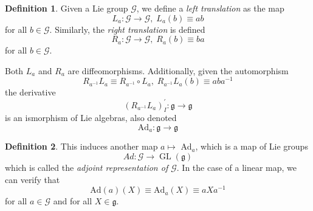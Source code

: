 \documentclass{article}
\DeclareMathOperator{\GL}{GL}
\theoremstyle{remark}
\theoremstyle{definition}
\newtheorem{definition}{Definition}[section]
\begin{document}
\begin{definition}
Given a Lie group $\mathcal{G}$, we define a \textit{left translation} as the map
\[L_a: \mathcal{G} \longrightarrow \mathcal{G}, \; L_a (b) \equiv a b\]
for all $b \in \mathcal{G}$. Similarly, the \textit{right translation} is defined
\[R_a: \mathcal{G} \longrightarrow \mathcal{G}, \; R_a (b) \equiv b a\]
for all $b \in \mathcal{G}$. 
\end{definition}

Both $L_a$ and $R_a$ are diffeomorphisms. Additionally, given the automorphism
\[R_{a^{-1}} L_a \equiv R_{a^{-1}} \circ L_a, \; R_{a^{-1}} L_a (b) \equiv a b a^{-1}\]
the derivative
\[(R_{a^{-1}} L_a)^\prime_I: \mathfrak{g} \longrightarrow \mathfrak{g}\]
is an ismorphism of Lie algebras, also denoted 
\[\text{Ad}_a: \mathfrak{g} \longrightarrow \mathfrak{g}\]
\begin{definition}
This induces another map $a \mapsto$ Ad$_a$, which is a map of Lie groups
\[Ad: \mathcal{G} \longrightarrow \GL(\mathcal{\mathfrak{g}})\]
which is called the \textit{adjoint representation of $\mathcal{G}$}. In the case of a linear map, we can verify that 
\[\text{Ad}(a) (X) \equiv \text{Ad}_a (X) \equiv a X a^{-1}\]
for all $a \in \mathcal{G}$ and for all $X \in \mathfrak{g}$. 
\end{definition}
\end{document}
